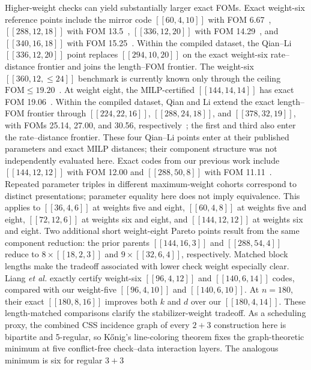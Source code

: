 \documentclass[aps,prx,twocolumn,superscriptaddress,nofootinbib,floatfix]{revtex4-2}
\newcommand{\code}[1]{\ensuremath{\left[\!\left[#1\right]\!\right]}}
\newcommand{\FOM}{\ensuremath{\mathrm{FOM}}}
\begin{document}
Higher-weight checks can yield substantially larger exact FOMs.  Exact
weight-six reference points include the mirror code
$\code{60,4,10}$ with FOM 6.67~\cite{khesin2026mirror},
$\code{288,12,18}$ with FOM 13.5~\cite{bravyi2024high},
$\code{336,12,20}$ with FOM 14.29~\cite{qian2026multiagent}, and
$\code{340,16,18}$ with FOM 15.25~\cite{liang2025generalized}.  Within the
compiled dataset, the Qian--Li $\code{336,12,20}$ point replaces
$\code{294,10,20}$ on the exact weight-six rate--distance frontier and joins
the length--FOM frontier.  The weight-six
$\code{360,12,{\leq}24}$ benchmark is currently known only through the ceiling
$\FOM\leq19.20$~\cite{bravyi2024high}.  At
weight eight, the MILP-certified $\code{144,14,14}$ has exact FOM
19.06~\cite{symons2025sequences}.  Within the compiled dataset, Qian and Li
extend the exact length--FOM frontier through $\code{224,22,16}$,
$\code{288,24,18}$, and
$\code{378,32,19}$, with FOMs 25.14, 27.00, and 30.56,
respectively~\cite{qian2026multiagent}; the first and third also enter the
rate--distance frontier.  These four Qian--Li points enter at their published
parameters and exact MILP distances; their component structure was not
independently evaluated here.  Exact codes from our previous work include
$\code{144,12,12}$ with FOM 12.00 and $\code{288,50,8}$ with FOM
11.11~\cite{cruzbenito2026evolutionary}.
Repeated parameter triples in different maximum-weight cohorts correspond to
distinct presentations; parameter equality here does not imply equivalence.
This applies to
$\code{36,4,6}$ at weights five and eight, $\code{60,4,8}$ at weights five
and eight, $\code{72,12,6}$ at weights six and eight, and
$\code{144,12,12}$ at weights six and eight.  Two additional short weight-eight
Pareto points result from the same component reduction: the prior parents
$\code{144,16,3}$ and $\code{288,54,4}$ reduce to
$8\times\code{18,2,3}$ and $9\times\code{32,6,4}$, respectively.
Matched block lengths make the tradeoff associated with lower check weight
especially clear.  Liang \emph{et al.} exactly certify weight-six
$\code{96,4,12}$ and $\code{140,6,14}$ codes, compared with our weight-five
$\code{96,4,10}$ and $\code{140,6,10}$.  At $n=180$, their exact
$\code{180,8,16}$ improves both $k$ and $d$ over our $\code{180,4,14}$.
These length-matched comparisons clarify the stabilizer-weight tradeoff.
As a scheduling proxy, the combined CSS incidence graph of every $2+3$
construction here is bipartite and 5-regular, so K\H{o}nig's line-coloring
theorem fixes the graph-theoretic minimum at five conflict-free check--data
interaction layers.  The analogous minimum is six for regular $3+3$
\end{document}
